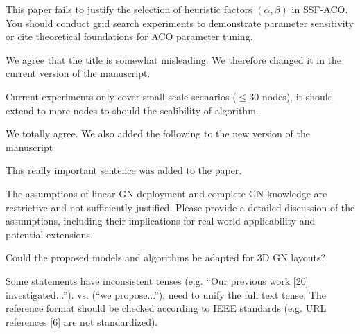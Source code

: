 \reviewer

\begin{revcomment}
	This paper fails to justify the selection of heuristic factors $(\alpha, \beta)$ in SSF-ACO. You should conduct grid search experiments to demonstrate parameter sensitivity or cite theoretical foundations for ACO parameter tuning.
\end{revcomment}
\begin{revresponse}
	We agree that the title is somewhat misleading.
	We therefore changed it in the current version of the manuscript.
\end{revresponse}

\begin{revcomment}
	Current experiments only cover small-scale scenarios ($\leq 30$ nodes), it should extend to more nodes to should the scalibility of algorithm.
\end{revcomment}
\begin{revresponse}
	We totally agree. We also added the following to the new version of the manuscript
	\begin{changes}
		This really important sentence was added to the paper.
	\end{changes}
\end{revresponse}

\begin{revcomment}
	The assumptions of linear GN deployment and complete GN knowledge are restrictive and not sufficiently justified. Please provide a detailed discussion of the assumptions, including their implications for real-world applicability and potential extensions.
\end{revcomment}
\begin{revresponse}
	
\end{revresponse}

\begin{revcomment}
	Could the proposed models and algorithms be adapted for 3D GN layouts?
\end{revcomment}
\begin{revresponse}
	
\end{revresponse}

\begin{revcomment}
	Some statements have inconsistent tenses (e.g. ``Our previous work [20] investigated...''). vs. (``we propose...''), need to unify the full text tense; The reference format should be checked according to IEEE standards (e.g. URL references [6] are not standardized).
\end{revcomment}
\begin{revresponse}
	
\end{revresponse}

